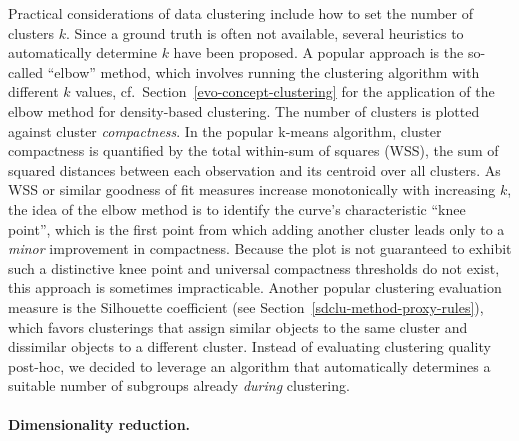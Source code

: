 \documentclass[
  oneside]{book}
\begin{document}
Practical considerations of data clustering include how to set the number of clusters \(k\).
Since a ground truth is often not available, several heuristics to automatically determine \(k\) have been proposed.
A popular approach is the so-called ``elbow'' method, which involves running the clustering algorithm with different \(k\) values, cf.~Section~\ref{evo-concept-clustering} for the application of the elbow method for density-based clustering.
The number of clusters is plotted against cluster \emph{compactness}.
In the popular k-means algorithm, cluster compactness is quantified by the total within-sum of squares (WSS), the sum of squared distances between each observation and its centroid over all clusters.
As WSS or similar goodness of fit measures increase monotonically with increasing \(k\), the idea of the elbow method is to identify the curve's characteristic ``knee point'', which is the first point from which adding another cluster leads only to a \emph{minor} improvement in compactness.
Because the plot is not guaranteed to exhibit such a distinctive knee point and universal compactness thresholds do not exist, this approach is sometimes impracticable.
Another popular clustering evaluation measure is the Silhouette coefficient (see Section~\ref{sdclu-method-proxy-rules}), which favors clusterings that assign similar objects to the same cluster and dissimilar objects to a different cluster.
Instead of evaluating clustering quality post-hoc, we decided to leverage an algorithm that automatically determines a suitable number of subgroups already \emph{during} clustering.

\paragraph*{Dimensionality reduction.}
\end{document}
